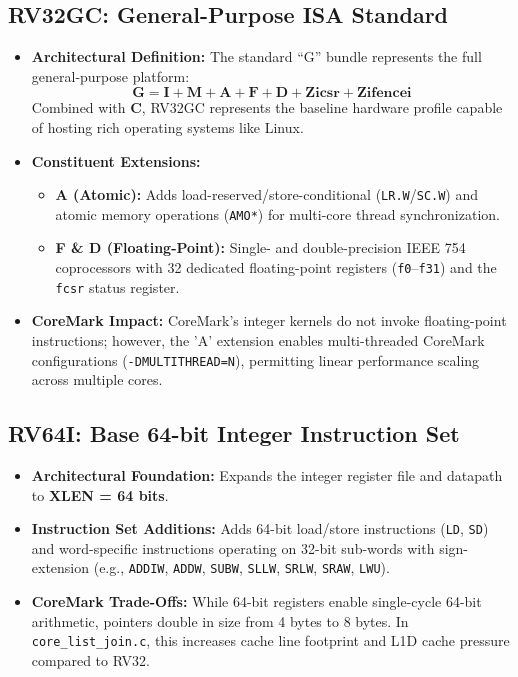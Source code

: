 \documentclass[11pt,a4paper]{article}
\begin{document}
\subsection{RV32GC: General-Purpose ISA Standard}
\begin{itemize}[leftmargin=1.4em]
    \item \textbf{Architectural Definition:} The standard ``G'' bundle represents the full general-purpose platform:
    \begin{equation}
        \mathbf{G} = \mathbf{I} + \mathbf{M} + \mathbf{A} + \mathbf{F} + \mathbf{D} + \mathbf{Zicsr} + \mathbf{Zifencei}
    \end{equation}
    Combined with \textbf{C}, RV32GC represents the baseline hardware profile capable of hosting rich operating systems like Linux.
    \item \textbf{Constituent Extensions:}
    \begin{itemize}
        \item \textbf{A (Atomic):} Adds load-reserved/store-conditional (\texttt{LR.W}/\texttt{SC.W}) and atomic memory operations (\texttt{AMO*}) for multi-core thread synchronization.
        \item \textbf{F \& D (Floating-Point):} Single- and double-precision IEEE 754 coprocessors with 32 dedicated floating-point registers (\texttt{f0}--\texttt{f31}) and the \texttt{fcsr} status register.
    \end{itemize}
    \item \textbf{CoreMark Impact:} CoreMark's integer kernels do not invoke floating-point instructions; however, the 'A' extension enables multi-threaded CoreMark configurations (\texttt{-DMULTITHREAD=N}), permitting linear performance scaling across multiple cores.
\end{itemize}

\subsection{RV64I: Base 64-bit Integer Instruction Set}
\begin{itemize}[leftmargin=1.4em]
    \item \textbf{Architectural Foundation:} Expands the integer register file and datapath to \textbf{XLEN = 64 bits}.
    \item \textbf{Instruction Set Additions:} Adds 64-bit load/store instructions (\texttt{LD}, \texttt{SD}) and word-specific instructions operating on 32-bit sub-words with sign-extension (e.g., \texttt{ADDIW}, \texttt{ADDW}, \texttt{SUBW}, \texttt{SLLW}, \texttt{SRLW}, \texttt{SRAW}, \texttt{LWU}).
    \item \textbf{CoreMark Trade-Offs:} While 64-bit registers enable single-cycle 64-bit arithmetic, pointers double in size from 4 bytes to 8 bytes. In \texttt{core\_list\_join.c}, this increases cache line footprint and L1D cache pressure compared to RV32.
\end{itemize}
\end{document}
